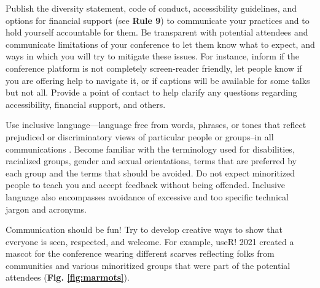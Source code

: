 \documentclass[10pt,letterpaper]{article}
\begin{document}
Publish the diversity statement, code of conduct, accessibility guidelines, and options for financial support (see \textbf{Rule 9}) to communicate your practices and to hold yourself accountable for them.
Be transparent with potential attendees and communicate limitations of your conference to let them know what to expect, and ways in which you will try to mitigate these issues. 
For instance, inform if the conference platform is not completely screen-reader friendly, let people know if you are offering help to navigate it, or if captions will be available for some talks but not all.
Provide a point of contact to help clarify any questions regarding accessibility, financial support, and others.

Use inclusive language—language free from words, phrases, or tones that reflect prejudiced or discriminatory views of particular people or groups–in all communications \cite{hallDesigningDiversityInclusion2019}. 
Become familiar with the terminology used for disabilities, racialized groups, gender and sexual orientations, terms that are preferred by each group and the terms that should be avoided.
Do not expect minoritized people to teach you and accept feedback without being offended.
Inclusive language also encompasses avoidance of excessive and too specific technical jargon and acronyms. 

Communication should be fun! Try to develop creative ways to show that everyone is seen, respected, and welcome. 
For example, useR! 2021 created a mascot for the conference wearing different scarves reflecting folks from communities and various minoritized groups that were part of the potential attendees (\textbf{Fig. \ref{fig:marmots}}). 
\end{document}
